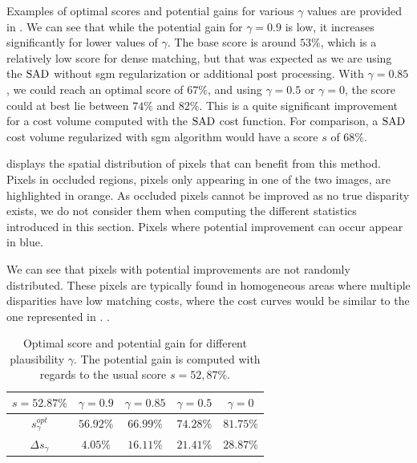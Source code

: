 Examples of optimal scores and potential gains for various $\gamma$ values are provided in . We can see that while the potential gain for $\gamma = 0.9$ is low, it increases significantly for lower values of $\gamma$. The base score is around $53\%$, which is a relatively low score for dense matching, but that was expected as we are using the $\mathrm{SAD}$ without \acrshort{sgm} regularization or additional post processing. With $\gamma=0.85$, we could reach an optimal score of $67\%$, and using $\gamma=0.5$ or $\gamma=0$, the score could at best lie between $74\%$ and $82\%$. This is a quite significant improvement for a cost volume computed with the $\mathrm{SAD}$ cost function. For comparison, a $\mathrm{SAD}$ cost volume regularized with \acrshort{sgm} algorithm would have a score $s$ of $68\%$.

 displays the spatial distribution of pixels that can benefit from this method. Pixels in occluded regions, \ie pixels only appearing in one of the two images, are highlighted in orange. As occluded pixels cannot be improved as no true disparity exists, we do not consider them when computing the different statistics introduced in this section. Pixels where potential improvement can occur appear in blue.

We can see that pixels with potential improvements are not randomly distributed. These pixels are typically found in homogeneous areas where multiple disparities have low matching costs, where the cost curves would be similar to the one represented in .
. 

\begin{table}[ht]
\centering
\begin{tabular}{|c|c|c|c|c|}
\hline
\rowcolor[HTML]{C0C0C0} 
$s=52.87\%$                                & $\gamma=0.9$ & $\gamma=0.85$ & $\gamma=0.5$ & $\gamma=0$ \\ \hline
\cellcolor[HTML]{C0C0C0}$s_\gamma^{opt}$   & $56.92\%$    & $66.99\%$     & $74.28\%$    & $81.75\%$  \\ \hline
\cellcolor[HTML]{C0C0C0}$\Delta s_\gamma$ & $4.05\%$     & $16.11\%$     & $21.41\%$    & $28.87\%$  \\ \hline
\end{tabular}
\caption{Optimal score and potential gain for different plausibility $\gamma$. The potential gain is computed with regards to the usual score $s=52,87\%$.}\label{tab:optimal_score}
\end{table}

